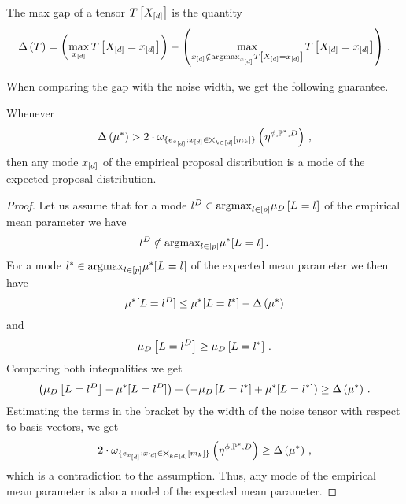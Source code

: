 \begin{definition}
    The max gap of a tensor $T\left[X_{[d]}\right]$ is the quantity
    \begin{align*}
        \Delta\left(T\right) =
        \left(\max_{x_{[d]}} T\left[X_{[d]}=x_{[d]}\right]\right) -
        \left(\max_{x_{[d]}\notin\mathrm{argmax}_{x_{[d]}}T\left[X_{[d]}=x_{[d]}\right]}
        T\left[X_{[d]}=x_{[d]}\right]\right) \, .
    \end{align*}
\end{definition}

When comparing the gap with the noise width, we get the following guarantee.

\begin{theorem}
    \label{the:detGuaranteeProposalDist}
    Whenever
    \begin{align*}
        \Delta\left(\mu^*\right)
        > 2 \cdot \omega_{\{e_{x_{[d]}}:x_{[d]}\in\bigtimes_{k\in[d]}[m_{k}]\}}\left(\eta^{\phi,\mathbb{P}^*,D}\right) \, ,
    \end{align*}
    then any mode $x_{[d]}$ of the empirical proposal distribution is a mode of the expected proposal distribution.
\end{theorem}
\begin{proof}
    Let us assume that for a mode $l^{D}\in\mathrm{argmax}_{l\in[p]}\mu_{D}\left[L_{}=l_{}\right]$ of the empirical mean parameter we have
    \begin{align*}
        l^{D}\notin\mathrm{argmax}_{l\in[p]}\mu^*[L_{}=l_{}] \, .
    \end{align*}
    For a mode $l^{*}\in\mathrm{argmax}_{l\in[p]}\mu^*[L_{}=l_{}]$ of the expected mean parameter we then have
    \begin{align*}
        \mu^*[L=l^{D}] \leq \mu^*[L=l^{*}] - \Delta\left(\mu^*\right)
    \end{align*}
    and
    \begin{align*}
        \mu_{D}\left[L=l^{D}\right] \geq \mu_{D}\left[L=l^{*}\right] \, .
    \end{align*}
    Comparing both intequalities we get
    \begin{align*}
        \left(\mu_{D}\left[L=l^{D}\right] - \mu^*[L=l^{D}]\right)
        + \left( - \mu_{D}\left[L=l^{*}\right] + \mu^*[L=l^{*}] \right)
        \geq \Delta\left(\mu^*\right) \, .
    \end{align*}
    Estimating the terms in the bracket by the width of the noise tensor with respect to basis vectors, we get
    \begin{align*}
        2 \cdot  \omega_{\{e_{x_{[d]}}:x_{[d]}\in\bigtimes_{k\in[d]}[m_{k}]\}}\left(\eta^{\phi,\mathbb{P}^*,D}\right)
        \geq \Delta\left(\mu^*\right) \, ,
    \end{align*}
    which is a contradiction to the assumption.
    Thus, any mode of the empirical mean parameter is also a model of the expected mean parameter.
\end{proof}

